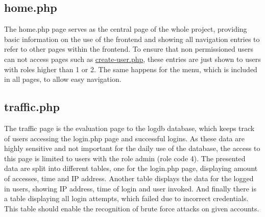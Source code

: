 
\subsection{home.php}

The home.php page serves as the central page of the whole project, providing basic information on the use of the frontend and showing all navigation entries to refer to other pages 
within the frontend. To ensure that non permissioned users can not access pages such as \hyperref[create-user.php]{create-user.php}, these entries are just shown to users with roles 
higher than 1 or 2. The same happens for the menu, which is included in all pages, to allow easy navigation. 

\subsection{traffic.php}
The traffic page is the evaluation page to the logdb database, which keeps track of users accessing the login.php page and successful logins. As these data are highly sensitive and 
not important for the daily use of the database, the access to this page is limited to users with the role admin (role code 4). The presented data are split into different tables, 
one for the login.php page, displaying amount of accesses, time and IP address. Another table displays the data for the logged in users, showing IP address, time of login and user 
invoked. And finally there is a table displaying all login attempts, which failed due to incorrect credentials. This table should enable the recognition of brute force attacks on 
given accounts.